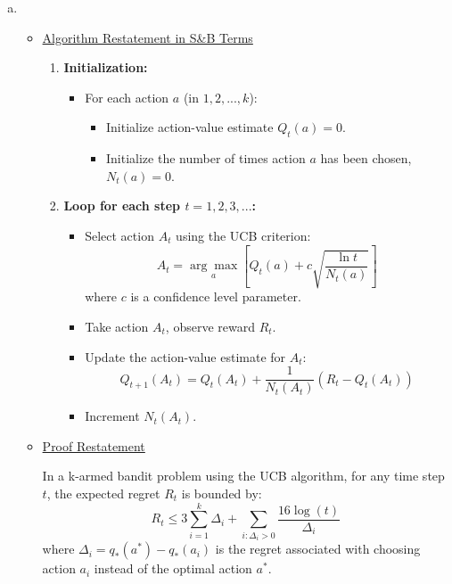 \documentclass{article}
\begin{document}
\begin{enumerate}[a)]
    \item  
    \begin{itemize}
        \item \underline{Algorithm Restatement in S\&B Terms}\par 
        \begin{enumerate}
            \item \textbf{Initialization:}
            \begin{itemize}
                \item For each action \( a \) (in \( 1, 2, ..., k \)):
                \begin{itemize}
                    \item Initialize action-value estimate \( Q_t(a) = 0 \).
                    \item Initialize the number of times action \( a \) has been chosen, \( N_t(a) = 0 \).
                \end{itemize}
            \end{itemize}
        
            \item \textbf{Loop for each step \( t = 1, 2, 3, ... \):}
            \begin{itemize}
                \item Select action \( A_t \) using the UCB criterion:
                \[ A_t = \underset{a}{\arg\max} \left[ Q_t(a) + c \sqrt{\frac{\ln t}{N_t(a)}} \right] \]
                where \( c \) is a confidence level parameter.
                
                \item Take action \( A_t \), observe reward \( R_t \).
                
                \item Update the action-value estimate for \( A_t \):
                \[ Q_{t+1}(A_t) = Q_t(A_t) + \frac{1}{N_t(A_t)} (R_t - Q_t(A_t)) \]
                
                \item Increment \( N_t(A_t) \).
            \end{itemize}
        \end{enumerate}

        \item \underline{Proof Restatement}\par 
        In a k-armed bandit problem using the UCB algorithm, for any time step \( t \), the expected regret \( R_t \) is bounded by:
\[ R_t \leq 3 \sum_{i=1}^{k} \Delta_i + \sum_{i: \Delta_i > 0} \frac{16 \log(t)}{\Delta_i} \]
where \( \Delta_i = q_*(a^*) - q_*(a_i) \) is the regret associated with choosing action \( a_i \) instead of the optimal action \( a^* \).



\end{itemize}
\end{enumerate}
\end{document}
